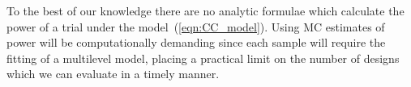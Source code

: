 \documentclass{article} %
\begin{document}
To the best of our knowledge there are no analytic formulae which calculate the power of a trial under the model~(\ref{eqn:CC_model}). Using MC estimates of power will be computationally demanding since each sample will require the fitting of a multilevel model, placing a practical limit on the number of designs which we can evaluate in a timely manner. 





\end{document}
